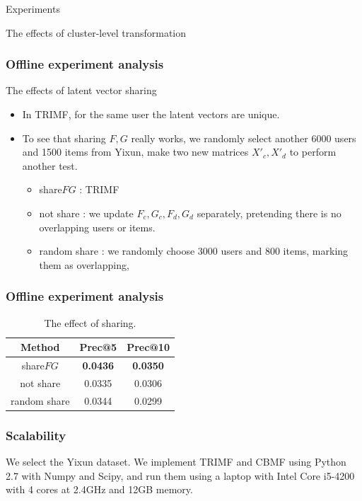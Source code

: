 \documentclass[xetex,mathserif,serif]{beamer}
\begin{document}
\begin{section}{Experiments}
\begin{frame}
\begin{block}{The effects of cluster-level transformation}
\begin{itemize}
      \end{itemize}
    \end{block}
  \end{frame}
  \begin{frame}
    \frametitle{Offline experiment analysis}
    \begin{block}
      {The effects of latent vector sharing}
      \begin{itemize}
      \item In TRIMF, for the same user the latent vectors are unique. 
      \item To see that sharing $F,G$ really works, we randomly select another 6000 users and 1500 items from Yixun, make two new matrices $X'_c, X'_d$ to perform another test.
        \begin{itemize}
        \item share$FG$ : TRIMF
        \item not share : we update $F_c, G_c, F_d, G_d$ separately, pretending there is no overlapping users or items.
        \item random share : we randomly choose 3000 users and 800 items, marking them as overlapping,
        \end{itemize}
      \end{itemize}
    \end{block}
  \end{frame}
  \begin{frame}
    \frametitle{Offline experiment analysis}
    \begin{table}
      \begin{center}
        \begin{tabular}{|c|c|c|}
          \hline
          Method&Prec@5&Prec@10\\
          \hline
          share$FG$&\textbf{\color{red}0.0436}&\textbf{\color{red}0.0350}\\
          \hline
          not share&0.0335&0.0306\\
          \hline
          random share&0.0344&0.0299\\
          \hline
        \end{tabular}
      \end{center}
      \caption{The effect of sharing.}
      \label{sharing}
    \end{table}
  \end{frame}
  \begin{frame}
    \frametitle{Scalability}
We select the Yixun dataset. We implement TRIMF and CBMF using Python 2.7 with Numpy and Scipy, and run them using a laptop with Intel Core i5-4200 with 4 cores at 2.4GHz and 12GB memory.


\end{frame}
\end{section}
\end{document}
